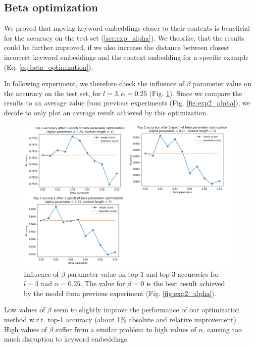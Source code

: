\documentclass{llncs}
\begin{document}
\subsection{Beta optimization}
\label{sec:exp_beta}
We proved that moving keyword embeddings closer to their contexts is beneficial for the accuracy on the test set (\ref{sec:exp_alpha}).
We theorize, that the results could be further improved, if we also increase the distance between closest incorrect keyword embeddings and the context embedding for a specific example (Eq. \ref{eq:beta_optimization}).

In following experiment, we therefore check the influence of \(\beta\) parameter value on the accuracy on the test set, for \(l=3, \alpha=0.25\) (Fig. \ref{fig:exp3_beta}).
Since we compare the results to an average value from previous experiments (Fig. \ref{fig:exp2_alpha}), we decide to only plot an average result achieved by this optimization.

\begin{figure}
    \centering
    \caption{Influence of \(\beta\) parameter value on top-1 and top-3 accuracies for \(l=3\) nad \(\alpha=0.25\). The value for \(\beta=0\) is the best result achieved by the model from previous experiment (Fig. \ref{fig:exp2_alpha}).}
    \label{fig:exp3_beta}
    \includegraphics[scale=0.7]{res/exp3_beta_top_acc.png}
\end{figure}

Low values of \(\beta\) seem to slightly improve the performance of our optimization method w.r.t. top-1 accuracy (about 1\% absolute and relative improvement).
High values of \(\beta\) suffer from a similar problem to high values of \(\alpha\), causing too much disruption to keyword embeddings.
\end{document}
